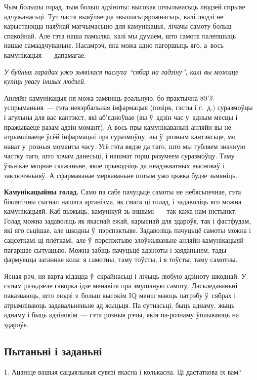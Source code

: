 Чым большы горад, тым больш адзіноты: высокая шчыльнасьць людзей спрыяе адчужанасьці. Тут часта выяўляецца звышасьцярожнасьць, калі людзі не карыстаюцца наяўнай магчымасьцю для камунікацыі, лічачы самоту больш спакойнай. Але гэта наша памылка, калі мы думаем, што самота палепшыць нашае самаадчуваньне. Насамрэч, яна можа адно пагоршыць яго, а~вось камунікацыя~--- дапамагае.

\emph{У буйных гарадах ужо зьявілася паслуга ``сябар на гадзіну'', калі вы можаце купіць увагу іншых людзей.}

Анляйн-камунікацыя ня можа замяніць рэальную, бо практычна 80\,\% успрыманьня~--- гэта невэрбальная інфармацыя (позірк, гэсты і г.~д.) суразмоўцы і агульны для вас кантэкст, які аб'ядноўвае (вы ў~адзін час у~адным месцы і пражываеце разам адзін момант). А вось пры камунікаваньні анляйн вы не атрымліваеце ўсёй інфармацыі пра суразмоўцу, вы ў~розным кантэксьце, мо нават у~розныя моманты часу. Усё гэта вядзе да таго, што мы губляем значную частку таго, што хочам данесьці, і нашмат горш разумеем суразмоўцу. Таму ўзьнікае моцнае скажэньне, якое прыводзіць да неадэкватных высноваў і заключэньняў. А сфармаванае меркаваньне потым ужо цяжка будзе зьмяніць.

\textbf{Камунікацыйны голад.} Само па сабе пачуцьцё самоты не небясьпечнае, гэта біялягічны сыгнал нашага арганізма, як смага ці голад, і задаволіць яго можна камунікацыяй. Каб выжыць, камунікуй зь іншымі~--- так кажа нам інстынкт. Голад можна задаволіць як якаснай ежай, карыснай для здароўя, так і фастфудам, які яго сьцішае, але шкодны ў~пэрспэктыве. Задаволіць пачуцьцё самоты можна і сацсеткамі ці плёткамі, але ў~пэрспэктыве злоўжываньне анляйн-камунікацыяй пагаршае сытуацыю. Можна забіць пачуцьцё адзіноты і заяданьнем, тады фармуецца заганнае кола: я самотны, таму тоўсты, і я тоўсты, таму самотны.

Ясная рэч, ня варта кідацца ў~скрайнасьці і лічыць любую адзіноту шкоднай. У гэтым разьдзеле гаворка ідзе менавіта пра змушаную самоту. Дасьледаваньні паказваюць, што людзі з~больш высокім IQ менш маюць патрэбу ў~сябрах і атрымліваюць задавальненьне ад жыцьця. Па сутнасьці, быць аднаму, жыць аднаму і быць адзінокім~--- гэта розныя рэчы, якія па-рознаму ўплываюць на здароўе.

\subsection*{Пытаньні і заданьні}

1. Ацаніце вашыя сацыяльныя сувязі якасна і колькасна. Ці дастаткова іх вам?

